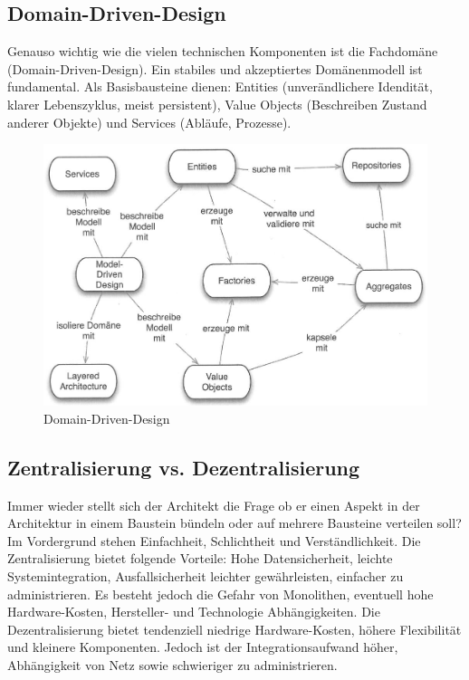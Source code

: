 \subsection{Domain-Driven-Design}
Genauso wichtig wie die vielen technischen Komponenten ist die Fachdomäne (Domain-Driven-Design). Ein stabiles und akzeptiertes Domänenmodell ist fundamental. Als Basisbausteine dienen: Entities (unverändlichere Idendität, klarer Lebenszyklus, meist persistent), Value Objects (Beschreiben Zustand anderer Objekte) und Services (Abläufe, Prozesse).

\begin{figure}[h!]
\centering
\includegraphics[width=0.7\linewidth]{fig/domain-driven-design}
\caption{Domain-Driven-Design}
\label{fig:domain-driven-design}
\end{figure}

\subsection{Zentralisierung vs. Dezentralisierung}
Immer wieder stellt sich der Architekt die Frage ob er einen Aspekt in der Architektur in einem Baustein bündeln oder auf mehrere Bausteine verteilen soll? Im Vordergrund stehen Einfachheit, Schlichtheit und Verständlichkeit. Die Zentralisierung bietet folgende Vorteile: Hohe Datensicherheit, leichte Systemintegration, Ausfallsicherheit leichter gewährleisten, einfacher zu administrieren. Es besteht jedoch die Gefahr von Monolithen, eventuell hohe Hardware-Kosten, Hersteller- und Technologie Abhängigkeiten. Die Dezentralisierung bietet tendenziell niedrige Hardware-Kosten, höhere Flexibilität und kleinere Komponenten. Jedoch ist der Integrationsaufwand höher, Abhängigkeit von Netz sowie schwieriger zu administrieren.


